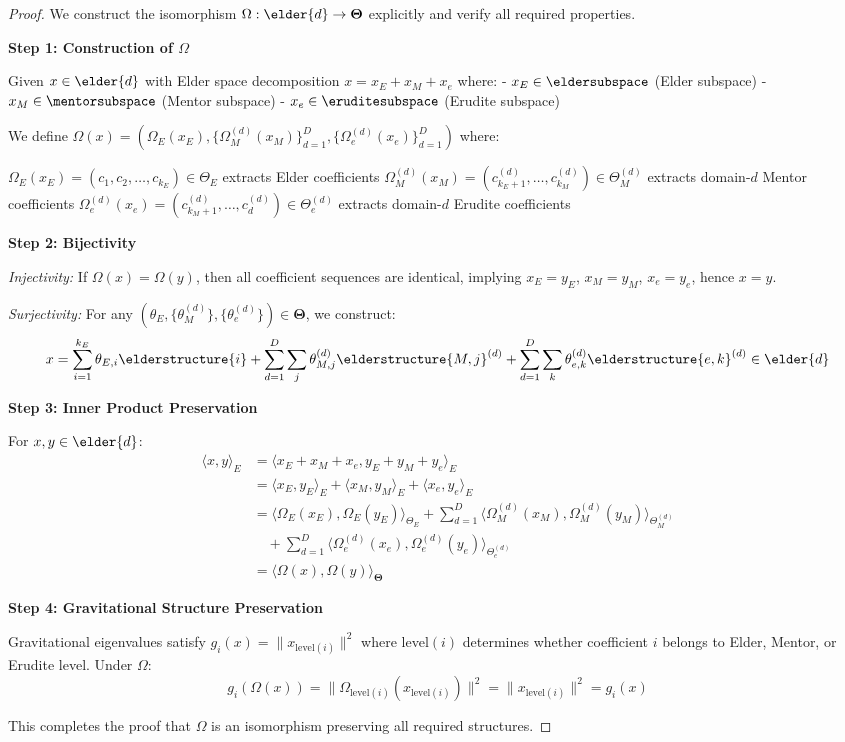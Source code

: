 \begin{proof}
We construct the isomorphism $\Omega: \elder{d} \rightarrow \boldsymbol{\Theta}$ explicitly and verify all required properties.

\textbf{Step 1: Construction of $\Omega$}

Given $x \in \elder{d}$ with Elder space decomposition $x = x_E + x_M + x_e$ where:
- $x_E \in \eldersubspace$ (Elder subspace)
- $x_M \in \mentorsubspace$ (Mentor subspace) 
- $x_e \in \eruditesubspace$ (Erudite subspace)

We define $\Omega(x) = (\Omega_E(x_E), \{\Omega_M^{(d)}(x_M)\}_{d=1}^D, \{\Omega_e^{(d)}(x_e)\}_{d=1}^D)$ where:

$\Omega_E(x_E) = (c_1, c_2, \ldots, c_{k_E}) \in \Theta_E$ extracts Elder coefficients
$\Omega_M^{(d)}(x_M) = (c_{k_E+1}^{(d)}, \ldots, c_{k_M}^{(d)}) \in \Theta_M^{(d)}$ extracts domain-$d$ Mentor coefficients  
$\Omega_e^{(d)}(x_e) = (c_{k_M+1}^{(d)}, \ldots, c_d^{(d)}) \in \Theta_e^{(d)}$ extracts domain-$d$ Erudite coefficients

\textbf{Step 2: Bijectivity}

\textit{Injectivity:} If $\Omega(x) = \Omega(y)$, then all coefficient sequences are identical, implying $x_E = y_E$, $x_M = y_M$, $x_e = y_e$, hence $x = y$.

\textit{Surjectivity:} For any $(\theta_E, \{\theta_M^{(d)}\}, \{\theta_e^{(d)}\}) \in \boldsymbol{\Theta}$, we construct:
$$x = \sum_{i=1}^{k_E} \theta_{E,i} \elderstructure{i} + \sum_{d=1}^D \sum_{j} \theta_{M,j}^{(d)} \elderstructure{M,j}^{(d)} + \sum_{d=1}^D \sum_{k} \theta_{e,k}^{(d)} \elderstructure{e,k}^{(d)} \in \elder{d}$$

\textbf{Step 3: Inner Product Preservation}

For $x, y \in \elder{d}$:
\begin{align}
\langle x, y \rangle_E &= \langle x_E + x_M + x_e, y_E + y_M + y_e \rangle_E \\
&= \langle x_E, y_E \rangle_E + \langle x_M, y_M \rangle_E + \langle x_e, y_e \rangle_E \\
&= \langle \Omega_E(x_E), \Omega_E(y_E) \rangle_{\Theta_E} + \sum_{d=1}^D \langle \Omega_M^{(d)}(x_M), \Omega_M^{(d)}(y_M) \rangle_{\Theta_M^{(d)}} \\
&\quad + \sum_{d=1}^D \langle \Omega_e^{(d)}(x_e), \Omega_e^{(d)}(y_e) \rangle_{\Theta_e^{(d)}} \\
&= \langle \Omega(x), \Omega(y) \rangle_{\boldsymbol{\Theta}}
\end{align}

\textbf{Step 4: Gravitational Structure Preservation}

Gravitational eigenvalues satisfy $g_i(x) = \|x_{\text{level}(i)}\|^2$ where level$(i)$ determines whether coefficient $i$ belongs to Elder, Mentor, or Erudite level. Under $\Omega$:
$$g_i(\Omega(x)) = \|\Omega_{\text{level}(i)}(x_{\text{level}(i)})\|^2 = \|x_{\text{level}(i)}\|^2 = g_i(x)$$

This completes the proof that $\Omega$ is an isomorphism preserving all required structures.
\end{proof}

